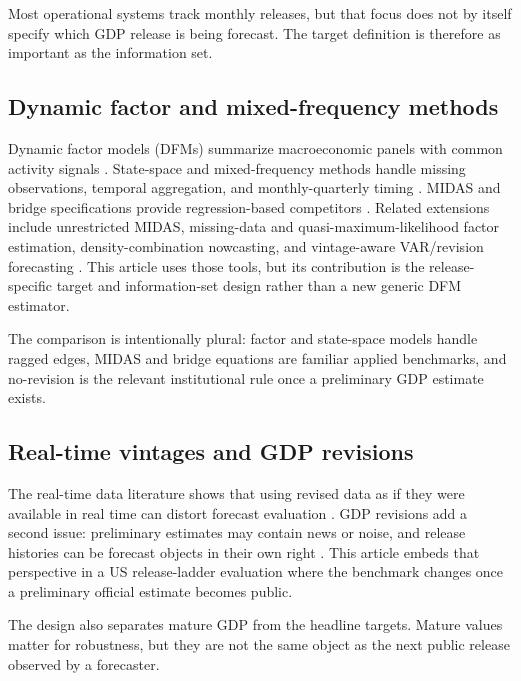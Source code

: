 \documentclass[12pt]{article}
\begin{document}
Most operational systems track monthly releases, but that focus does not by itself specify which GDP release is being forecast. The target definition is therefore as important as the information set.

\subsection{Dynamic factor and mixed-frequency methods}

Dynamic factor models (DFMs) summarize macroeconomic panels with common activity signals \citep{forni2000,stockwatson2002,bai2002}. State-space and mixed-frequency methods handle missing observations, temporal aggregation, and monthly-quarterly timing \citep{doz2011,marianomurasawa2003,schorfheide2015}. MIDAS and bridge specifications provide regression-based competitors \citep{ghysels2007,marcellinoschumacher2010,kuzin2011}. Related extensions include unrestricted MIDAS, missing-data and quasi-maximum-likelihood factor estimation, density-combination nowcasting, and vintage-aware VAR/revision forecasting \citep{foroni2015,banburamodugno2014,doz2012,aastveit2014,clementsgalvao2008,clementsgalvao2012,clementsgalvao2013,kishorkoenig2012}. This article uses those tools, but its contribution is the release-specific target and information-set design rather than a new generic DFM estimator.

The comparison is intentionally plural: factor and state-space models handle ragged edges, MIDAS and bridge equations are familiar applied benchmarks, and no-revision is the relevant institutional rule once a preliminary GDP estimate exists.

\subsection{Real-time vintages and GDP revisions}

The real-time data literature shows that using revised data as if they were available in real time can distort forecast evaluation \citep{croushorestark2001,croushorestark2003,koenig2003}. GDP revisions add a second issue: preliminary estimates may contain news or noise, and release histories can be forecast objects in their own right \citep{mankiwshapiro1986,jacobsvannorden2011,anesti2022}. This article embeds that perspective in a US release-ladder evaluation where the benchmark changes once a preliminary official estimate becomes public.

The design also separates mature GDP from the headline targets. Mature values matter for robustness, but they are not the same object as the next public release observed by a forecaster.
\end{document}
